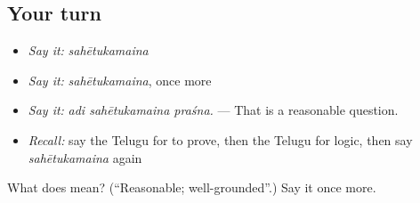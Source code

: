 \subsection*{Your turn}
\begin{itemize}
\raggedright
  \item \emph{Say it:} \emph{sahētukamaina}
  \item \emph{Say it:} \emph{sahētukamaina}, once more
  \item \emph{Say it:} \emph{adi sahētukamaina praśna.} — That is a reasonable question.
  \item \emph{Recall:} say the Telugu for to prove, then the Telugu for logic, then say \emph{sahētukamaina} again
\end{itemize}

\begin{tcolorbox}[breakable,colback=teal!4,colframe=teal!35!black,title={Before you move on}]
What does  mean? (\textquotedblleft{}Reasonable; well-grounded\textquotedblright{}.) Say it once more.
\end{tcolorbox}
